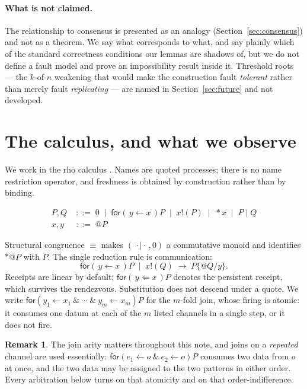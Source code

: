 \documentclass[11pt]{article}
\theoremstyle{definition}
\newtheorem{remark}[theorem]{Remark}
\newcommand{\rhoc}{rho calculus}
\newcommand{\In}[2]{\mathsf{for}(\,#1 \leftarrow #2\,)}
\newcommand{\Inp}[2]{\mathsf{for}(\,#1 \Leftarrow #2\,)}
\begin{document}
\paragraph{What is not claimed.} The relationship to consensus is presented as an analogy (Section~\ref{sec:consensus}) and not as a theorem. We say what corresponds to what, and say plainly which of the standard correctness conditions our lemmas are shadows of, but we do not define a fault model and prove an impossibility result inside it. Threshold roots --- the $k$-of-$n$ weakening that would make the construction fault \emph{tolerant} rather than merely fault \emph{replicating} --- are named in Section~\ref{sec:future} and not developed.

\section{The calculus, and what we observe}

We work in the \rhoc{} \cite{MR05}. Names are quoted processes; there is no name restriction operator, and freshness is obtained by construction rather than by binding.

\begin{align*}
  P,Q \;&::=\; 0 \;\mid\; \In{y}{x}P \;\mid\; x!(P) \;\mid\; {*}x \;\mid\; P \mid Q \\
  x,y \;&::=\; @P
\end{align*}

Structural congruence $\equiv$ makes $(\,\cdot \mid \cdot\,, 0)$ a commutative monoid and identifies ${*}@P$ with $P$. The single reduction rule is communication:
\[
  \In{y}{x}P \;\mid\; x!(Q) \;\longrightarrow\; P\{@Q/y\} .
\]
Receipts are linear by default; $\Inp{y}{x}P$ denotes the persistent receipt, which survives the rendezvous. Substitution does not descend under a quote. We write $\mathsf{for}(y_1 \leftarrow x_1\ \&\ \cdots\ \&\ y_m \leftarrow x_m)P$ for the $m$-fold join, whose firing is atomic: it consumes one datum at each of the $m$ listed channels in a single step, or it does not fire.

\begin{remark}
The join arity matters throughout this note, and joins on a \emph{repeated} channel are used essentially: $\mathsf{for}(e_1 \leftarrow o\ \&\ e_2 \leftarrow o)P$ consumes two data from $o$ at once, and the two data may be assigned to the two patterns in either order. Every arbitration below turns on that atomicity and on that order-indifference.
\end{remark}
\end{document}
